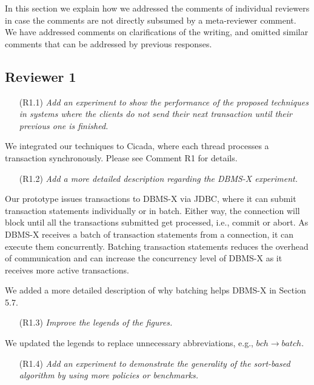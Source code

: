 \documentclass{article}
\newcommand{\changed}[1]{#1}
\newcommand{\changed}[1]{{\color{blue}#1}}
\begin{document}
In this section we explain how we addressed the comments of individual reviewers in case the comments are not directly subsumed by a meta-reviewer comment. We have addressed comments on clarifications of the writing, and omitted similar comments that can be addressed by previous responses.

\subsection{Reviewer 1}

\begin{itemize}
\item[(R1.1)] \emph{Add an experiment to show the performance of the proposed techniques in systems where the clients do not send their next transaction until their previous one is finished.}
\end{itemize}
\changed{
	We integrated our techniques to Cicada, where each thread processes a transaction synchronously. Please see Comment R1 for details.
}

\begin{itemize}
\item[(R1.2)] \emph{Add a more detailed description regarding the DBMS-X experiment.}
\end{itemize}

\changed{
	Our prototype issues transactions to DBMS-X via JDBC, where it can submit transaction statements individually or in batch. Either way, the connection will block until all the transactions submitted get processed, i.e., commit or abort. As DBMS-X receives a batch of transaction statements from a connection, it can execute them concurrently. Batching transaction statements reduces the overhead of communication and can increase the concurrency level of DBMS-X as it receives more active transactions.
	
	We added a more detailed description of why batching helps DBMS-X in Section 5.7.
}

\begin{itemize}
\item[(R1.3)] \emph{Improve the legends of the figures.}
\end{itemize}

\changed{
	We updated the legends to replace unnecessary abbreviations, e.g., $bch \to batch$.
}

\begin{itemize}
\item[(R1.4)] \emph{Add an experiment to demonstrate the generality of the sort-based algorithm by using more policies or benchmarks.}
\end{itemize}
\end{document}
